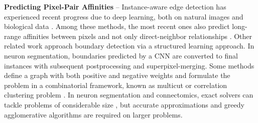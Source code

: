 \textbf{Predicting Pixel-Pair Affinities} --  
Instance-aware edge detection has experienced recent progress due to deep learning, both on natural images and biological data \cite{Gao_2019_ICCV,liu2018affinity,lee2017superhuman,wolf2018mutex,schmidt2018cell,zeng2017deepem3d,parag2017anisotropic,bailoni2019generalized}. Among these methods, the most recent ones also predict long-range affinities between pixels and not only direct-neighbor relationships \cite{Gao_2019_ICCV,liu2018affinity,lee2017superhuman}.
Other related work \cite{funke2018large,turaga2009maximin} approach boundary detection via a structured learning approach.
In neuron segmentation, boundaries predicted by a CNN are converted to final instances with subsequent postprocessing and superpixel-merging.
Some methods define a graph with both positive and negative weights and formulate the problem in a combinatorial framework, known as multicut or correlation clustering problem \cite{chopra1991multiway}. 
In neuron segmentation and connectomics, exact solvers can tackle problems of considerable size \cite{andres2012globally}, but accurate approximations \cite{pape2017solving,yarkony2012fast} and greedy agglomerative algorithms \cite{levinkov2017comparative,wolf2019mutex,bailoni2019generalized} are required on larger problems.


